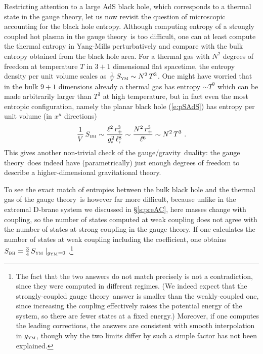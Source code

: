 \documentclass[12pt,a4paper]{article}
\def\sect#1{\S\ref{#1}}
\def\req#1{(\ref{#1})}
\def\GG{gauge/gravity}
\def\GT{gauge theory}
\def\gst{g_{\scriptscriptstyle {\rm s}}}
\def\gYM{g_{\scriptscriptstyle {\rm YM}}}
\def\lst{\ell_{\scriptscriptstyle {\rm s}}}
\def\Rads{\ell}
\def\rh{r_+}
\def\Sbh{S_{\scriptscriptstyle {\rm BH}}}
\def\Sgt{S_{\scriptscriptstyle {\rm YM}}}
\begin{document}
Restricting attention to a large AdS black hole, which corresponds to a thermal state in the \GT, let us now revisit the question of microscopic accounting for the black hole entropy.  
Although computing entropy of a strongly coupled hot plasma in the \GT\ is too difficult, one can at least compute the thermal entropy in Yang-Mills perturbatively and compare with the bulk entropy obtained from the black hole area.  
For a thermal gas with $N^2$ degrees of freedom at temperature $T$ in $3+1$ dimensional flat spacetime, the entropy density per unit volume scales as $\frac{1}{V} \, \Sgt \sim N^2 \, T^3$.
One might have worried that in the bulk $9+1$ dimensions already a thermal gas has entropy $\sim T^9$ which can be made arbitrarily larger than $T^3$ at high temperature, but in fact even the most entropic configuration, namely the planar black hole \req{e:pSAdS} has entropy per unit volume (in $x^\mu$ directions) 
%
\begin{equation}
\frac{1}{V} \, \Sbh \sim 
\frac{\Rads^2 \, \rh^3}{\gst^2 \, \lst^8} \sim 
\frac{ N^2 \, \rh^3 }{\Rads^6} 
\sim N^2 \, T^3 \ .
\label{e:entropy}
\end{equation}	
%
This gives another non-trivial check of the \GG\ duality: the \GT\ does indeed have (parametrically) just enough degrees of freedom to describe a higher-dimensional gravitational theory.  

To see the exact match of entropies between the bulk black hole and the thermal gas of the \GT\ is however far more difficult, because unlike in the extremal D-brane system we discussed in \sect{s:preAC}, here masses change with coupling, so the number of states computed at weak coupling does not agree with  the number of states at strong coupling in the \GT.  
If one calculates the number of states at weak coupling including the coefficient, one obtains $\Sbh = \frac{3}{4} \, {\Sgt}\mid_{\gYM=0}$ \cite{Gubser:1996de}.\footnote{
The fact that the two answers do not match precisely is not a contradiction, since they were computed in different regimes.  (We indeed expect that the strongly-coupled \GT\ answer is smaller than the weakly-coupled one, since increasing the coupling effectively raises the potential energy of the system, so there are fewer states at a fixed energy.)  Moreover, if one computes the leading corrections, the answers are consistent with smooth interpolation in $\gYM$, though why the two limits differ by such a simple factor has not been explained.}
\end{document}
